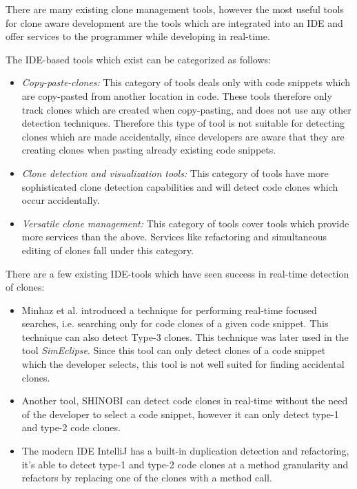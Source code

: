 \documentclass[12pt]{article}
\begin{document}
There are many existing clone management tools, however the most useful tools for clone
aware development are the tools which are integrated into an IDE and offer services to the
programmer while developing in real-time. 

The IDE-based tools which exist can be categorized as
follows\cite[8]{Udding_Towards_Convenient_Management}:

\begin{itemize}
    \item\textit{Copy-paste-clones:} This category of tools deals only with code snippets which are
    copy-pasted from another location in code. These tools therefore only track clones which
    are created when copy-pasting, and does not use any other detection techniques. Therefore
    this type of tool is not suitable for detecting clones which are made accidentally, since
    developers are aware that they are creating clones when pasting already existing code
    snippets.

    \item\textit{Clone detection and visualization tools:} This category of tools have more
    sophisticated clone detection capabilities and will detect code clones which occur
    accidentally.

    \item\textit{Versatile clone management:} This category of tools cover tools which provide more
    services than the above. Services like refactoring and simultaneous editing of clones fall
    under this category.
\end{itemize}

There are a few existing IDE-tools which have seen success in real-time detection of clones:

\begin{itemize}
        \item Minhaz et al. introduced a technique for performing real-time focused
            searches, i.e. searching only for code clones of a given code snippet. This
            technique can also detect Type-3 clones.\cite{Zibran_real_time_search} 
        This technique was later used in the tool
        \textit{SimEclipse}.\cite{Udding_Towards_Convenient_Management} Since this tool
        can only detect clones of a code snippet which the developer selects, this tool is
        not well suited for finding accidental clones.

        \item Another tool, SHINOBI can detect code clones in real-time without the need
            of the developer to select a code snippet, however it can only detect type-1
            and type-2 code clones.\cite{SHINOBI}
        \item The modern IDE IntelliJ has a built-in duplication detection and
            refactoring, it's able to detect type-1 and type-2 code clones at a method
            granularity and refactors by replacing one of the clones with a method call.
\end{itemize}
\end{document}
